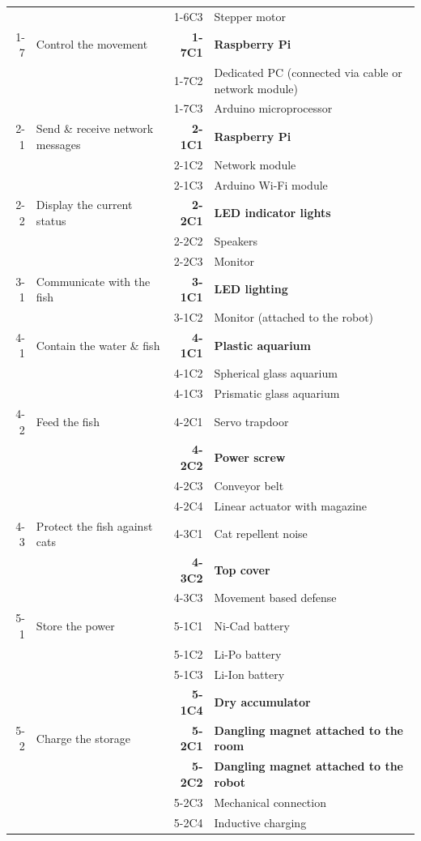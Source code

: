 \documentclass[a4paper, 10pt, DIV=16, parskip = full, twocolumn = true]{scrartcl}
\begin{document}
\begin{table}
\begin{tabular}{rlrl}
		& & 1-6C3 & Stepper motor \\
		1-7 & Control the movement & \textbf{1-7C1} & \textbf{Raspberry Pi} \\
		& & 1-7C2 & Dedicated PC (connected via cable or network module) \\	
		& & 1-7C3 & Arduino microprocessor \\	
		2-1 & Send \& receive network messages & \textbf{2-1C1} & \textbf{Raspberry Pi} \\
		& & 2-1C2 & Network module \\	
		& & 2-1C3 & Arduino Wi-Fi module \\
		2-2 & Display the current status & \textbf{2-2C1} & \textbf{LED indicator lights} \\
		& & 2-2C2 & Speakers \\	
		& & 2-2C3 & Monitor \\	
		3-1 & Communicate with the fish & \textbf{3-1C1} & \textbf{LED lighting} \\
		& & 3-1C2 & Monitor (attached to the robot) \\		
		4-1 & Contain the water \& fish & \textbf{4-1C1} & \textbf{Plastic aquarium} \\
		& & 4-1C2 & Spherical glass aquarium \\	
		& & 4-1C3 & Prismatic glass aquarium \\
		4-2 & Feed the fish & 4-2C1 & Servo trapdoor \\
		& & \textbf{4-2C2} & \textbf{Power screw} \\	
		& & 4-2C3 & Conveyor belt \\
		& & 4-2C4 & Linear actuator with magazine \\
		4-3 & Protect the fish against cats & 4-3C1 & Cat repellent noise \\
		& & \textbf{4-3C2} & \textbf{Top cover} \\	
		& & 4-3C3 & Movement based defense \\
		5-1 & Store the power & 5-1C1 & Ni-Cad battery \\
		& & 5-1C2 & Li-Po battery \\	
		& & 5-1C3 & Li-Ion battery \\
		& & \textbf{5-1C4} & \textbf{Dry accumulator} \\	
		5-2 & Charge the storage & \textbf{5-2C1} & \textbf{Dangling magnet attached to the room} \\
		& & \textbf{5-2C2} & \textbf{Dangling magnet attached to the robot} \\	
		& & 5-2C3 & Mechanical connection \\
		& & 5-2C4 & Inductive charging \\
	\bottomrule
	\end{tabular}
\label{table:concepts}
\end{table}
\end{document}
